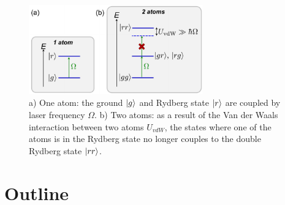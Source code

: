 \begin{figure}
	\centering
	\includegraphics[width=7.5cm]{figures/RydbergBlockade.pdf}
	\caption{a) One atom: the ground $\lvert g\rangle$ and Rydberg state $\lvert r\rangle$ are coupled by laser frequency $\Omega$. b) Two atoms: as a result of the Van der Waals interaction between two atoms $U_{vdW}$, the states where one of the atoms is in the Rydberg state no longer couples to the double Rydberg state $\lvert rr\rangle$. }
	\label{fig:RydbergBlockade}
\end{figure}




\section{Outline}
